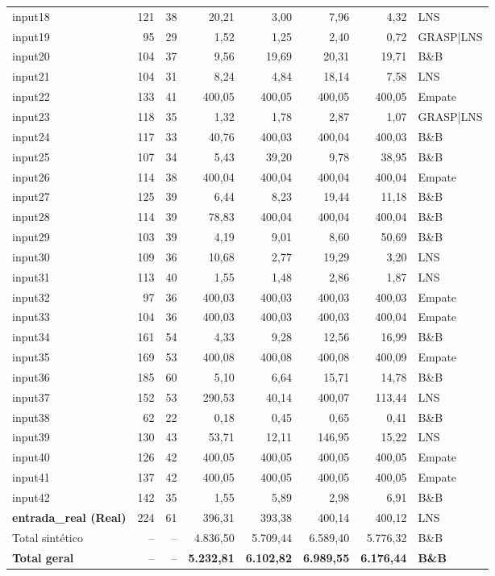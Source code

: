 \begin{longtable}{@{}lrrrrrrl@{}}
input18 & 121 & 38 & 20,21 & 3,00 & 7,96 & 4,32 & LNS \\
input19 & 95 & 29 & 1,52 & 1,25 & 2,40 & 0,72 & GRASP{|}LNS \\
input20 & 104 & 37 & 9,56 & 19,69 & 20,31 & 19,71 & B\&B \\
input21 & 104 & 31 & 8,24 & 4,84 & 18,14 & 7,58 & LNS \\
input22 & 133 & 41 & 400,05 & 400,05 & 400,05 & 400,05 & Empate \\
input23 & 118 & 35 & 1,32 & 1,78 & 2,87 & 1,07 & GRASP{|}LNS \\
input24 & 117 & 33 & 40,76 & 400,03 & 400,04 & 400,03 & B\&B \\
input25 & 107 & 34 & 5,43 & 39,20 & 9,78 & 38,95 & B\&B \\
input26 & 114 & 38 & 400,04 & 400,04 & 400,04 & 400,04 & Empate \\
input27 & 125 & 39 & 6,44 & 8,23 & 19,44 & 11,18 & B\&B \\
input28 & 114 & 39 & 78,83 & 400,04 & 400,04 & 400,04 & B\&B \\
input29 & 103 & 39 & 4,19 & 9,01 & 8,60 & 50,69 & B\&B \\
input30 & 109 & 36 & 10,68 & 2,77 & 19,29 & 3,20 & LNS \\
input31 & 113 & 40 & 1,55 & 1,48 & 2,86 & 1,87 & LNS \\
input32 & 97 & 36 & 400,03 & 400,03 & 400,03 & 400,03 & Empate \\
input33 & 104 & 36 & 400,03 & 400,03 & 400,03 & 400,04 & Empate \\
input34 & 161 & 54 & 4,33 & 9,28 & 12,56 & 16,99 & B\&B \\
input35 & 169 & 53 & 400,08 & 400,08 & 400,08 & 400,09 & Empate \\
input36 & 185 & 60 & 5,10 & 6,64 & 15,71 & 14,78 & B\&B \\
input37 & 152 & 53 & 290,53 & 40,14 & 400,07 & 113,44 & LNS \\
input38 & 62 & 22 & 0,18 & 0,45 & 0,65 & 0,41 & B\&B \\
input39 & 130 & 43 & 53,71 & 12,11 & 146,95 & 15,22 & LNS \\
input40 & 126 & 42 & 400,05 & 400,05 & 400,05 & 400,05 & Empate \\
input41 & 137 & 42 & 400,05 & 400,05 & 400,05 & 400,05 & Empate \\
input42 & 142 & 35 & 1,55 & 5,89 & 2,98 & 6,91 & B\&B \\
\rowcolor{realrow} \textbf{entrada\_real (Real)} & 224 & 61 & 396,31 & 393,38 & 400,14 & 400,12 & LNS \\
\midrule
Total sintético & -- & -- & 4.836,50 & 5.709,44 & 6.589,40 & 5.776,32 & B\&B \\
\textbf{Total geral} & -- & -- & \textbf{5.232,81} & \textbf{6.102,82} & \textbf{6.989,55} & \textbf{6.176,44} & \textbf{B\&B} \\
\end{longtable}
\endgroup
